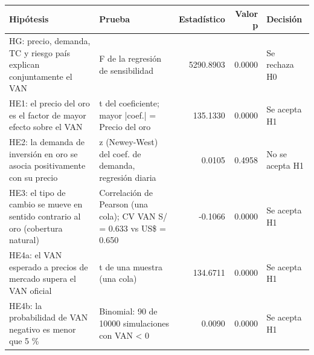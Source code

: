\begin{tabular}{llrrl}
\toprule
Hipótesis & Prueba & Estadístico & Valor p & Decisión \\
\midrule
HG: precio, demanda, TC y riesgo país explican conjuntamente el VAN & F de la regresión de sensibilidad & 5290.8903 & 0.0000 & Se rechaza H0 \\
HE1: el precio del oro es el factor de mayor efecto sobre el VAN & t del coeficiente; mayor |coef.| = Precio del oro & 135.1330 & 0.0000 & Se acepta H1 \\
HE2: la demanda de inversión en oro se asocia positivamente con su precio & z (Newey-West) del coef. de demanda, regresión diaria & 0.0105 & 0.4958 & No se acepta H1 \\
HE3: el tipo de cambio se mueve en sentido contrario al oro (cobertura natural) & Correlación de Pearson (una cola); CV VAN S/ = 0.633 vs US\$ = 0.650 & -0.1066 & 0.0000 & Se acepta H1 \\
HE4a: el VAN esperado a precios de mercado supera el VAN oficial & t de una muestra (una cola) & 134.6711 & 0.0000 & Se acepta H1 \\
HE4b: la probabilidad de VAN negativo es menor que 5 \% & Binomial: 90 de 10000 simulaciones con VAN < 0 & 0.0090 & 0.0000 & Se acepta H1 \\
\bottomrule
\end{tabular}
